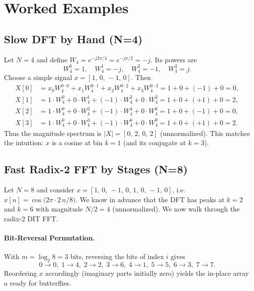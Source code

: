 \documentclass[11pt,a4paper]{article}
\begin{document}
\section{Worked Examples}

\subsection{Slow DFT by Hand (N=4)}
Let $N=4$ and define $W_4 = e^{-j 2\pi/4} = e^{-j\pi/2} = -j$. Its powers are
\begin{equation}
W_4^0 = 1,\quad W_4^1 = -j,\quad W_4^2 = -1,\quad W_4^3 = j.
\end{equation}
Choose a simple signal $x=[1,\,0,\,-1,\,0]$. Then
\begin{align}
X[0] &= x_0 W_4^{0\cdot 0} + x_1 W_4^{0\cdot 1} + x_2 W_4^{0\cdot 2} + x_3 W_4^{0\cdot 3}
     = 1 + 0 + (-1) + 0 = 0,\\
X[1] &= 1\cdot W_4^{0} + 0\cdot W_4^{1} + (-1)\cdot W_4^{2} + 0\cdot W_4^{3}
     = 1 + 0 + (+1) + 0 = 2,\\
X[2] &= 1\cdot W_4^{0} + 0\cdot W_4^{2} + (-1)\cdot W_4^{4} + 0\cdot W_4^{6}
     = 1 + 0 + (-1) + 0 = 0,\\
X[3] &= 1\cdot W_4^{0} + 0\cdot W_4^{3} + (-1)\cdot W_4^{6} + 0\cdot W_4^{9}
     = 1 + 0 + (+1) + 0 = 2.
\end{align}
Thus the magnitude spectrum is $|X| = [0,\,2,\,0,\,2]$ (unnormalized). This matches the intuition: $x$ is a cosine at bin $k=1$ (and its conjugate at $k=3$).

\subsection{Fast Radix-2 FFT by Stages (N=8)}
Let $N=8$ and consider $x=[1,\,0,\,-1,\,0,\,1,\,0,\,-1,\,0]$, i.e.
$x[n] = \cos\!\big(2\pi \cdot 2\, n/8\big)$. We know in advance that the DFT has peaks at $k=2$ and $k=6$ with magnitude $N/2 = 4$ (unnormalized). We now walk through the radix-2 DIT FFT.

\paragraph{Bit-Reversal Permutation.}
With $m=\log_2 8 = 3$ bits, reversing the bits of index $i$ gives
\begin{equation}
0\to0,\;1\to4,\;2\to2,\;3\to6,\;4\to1,\;5\to5,\;6\to3,\;7\to7.
\end{equation}
Reordering $x$ accordingly (imaginary parts initially zero) yields the in-place array $a$ ready for butterflies.
\end{document}
